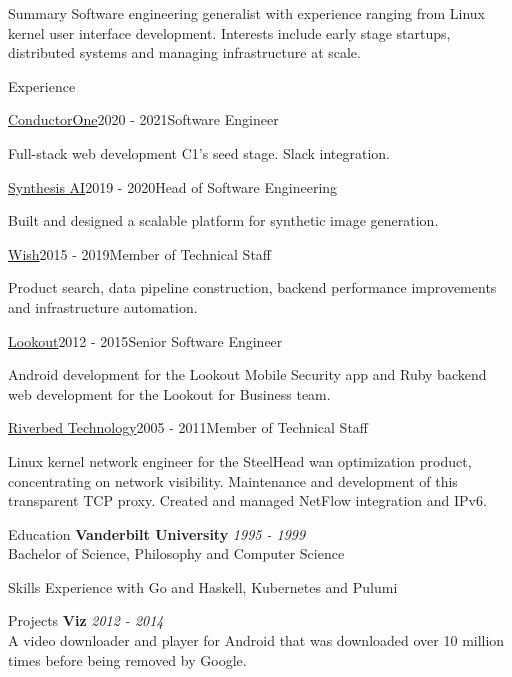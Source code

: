 \documentclass{resume} %
\begin{document}
\begin{rSection}{Summary}
Software engineering generalist with experience ranging from Linux kernel user interface development. Interests include
early stage startups, distributed systems and managing infrastructure at scale.
\end{rSection}

\begin{rSection}{Experience}

\begin{rSubsection}{\href{https://conductorone.com}{ConductorOne}}{2020 - 2021}{Software Engineer}{}
\item Full-stack web development C1's seed stage. Slack integration.
\end{rSubsection}

\begin{rSubsection}{\href{https://synthesis.ai}{Synthesis AI}}{2019 - 2020}{Head of Software Engineering}{}
\item Built and designed a scalable platform for synthetic image generation.
\end{rSubsection}

\begin{rSubsection}{\href{https://wish.com}{Wish}}{2015 - 2019}{Member of Technical Staff}{}
\item Product search, data pipeline construction, backend performance improvements and infrastructure automation.
\end{rSubsection}

\begin{rSubsection}{\href{https://lookout.com}{Lookout}}{2012 - 2015}{Senior Software Engineer}{}
\item Android development for the Lookout Mobile Security app and Ruby backend web development for the Lookout for Business team.
\end{rSubsection}

\begin{rSubsection}{\href{https://riverbed.com}{Riverbed Technology}}{2005 - 2011}{Member of Technical Staff}{}
\item Linux kernel network engineer for the SteelHead wan optimization product, concentrating on network visibility.
Maintenance and development of this transparent TCP proxy. Created and managed NetFlow integration and IPv6.
\end{rSubsection}

\end{rSection}


\begin{rSection}{Education}
{\bf Vanderbilt University} \hfill {\em 1995 - 1999}
\\ Bachelor of Science, Philosophy and Computer Science
\end{rSection}


\begin{rSection}{Skills}
Experience with Go and Haskell, Kubernetes and Pulumi
\end{rSection}

\begin{rSection}{Projects}
	{\bf Viz} \hfill {\em 2012 - 2014}
\\ A video downloader and player for Android that was downloaded over 10 million times before being removed by Google.
\end{rSection}
\end{document}
